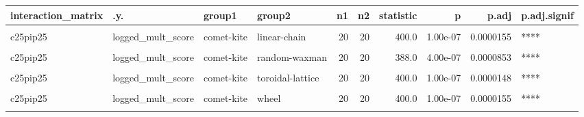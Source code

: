 \documentclass[
]{book}
\begin{document}
\begin{table}
\centering
\begin{tabular}{l|l|l|l|r|r|r|r|r|l}
\hline
interaction\_matrix & .y. & group1 & group2 & n1 & n2 & statistic & p & p.adj & p.adj.signif\\
\hline
\cellcolor{gray!6}{c25pip25} & \cellcolor{gray!6}{logged\_mult\_score} & \cellcolor{gray!6}{comet-kite} & \cellcolor{gray!6}{cycle} & \cellcolor{gray!6}{20} & \cellcolor{gray!6}{20} & \cellcolor{gray!6}{400.0} & \cellcolor{gray!6}{1.00e-07} & \cellcolor{gray!6}{0.0000155} & \cellcolor{gray!6}{****}\\
\hline
c25pip25 & logged\_mult\_score & comet-kite & linear-chain & 20 & 20 & 400.0 & 1.00e-07 & 0.0000155 & ****\\
\hline
\cellcolor{gray!6}{c25pip25} & \cellcolor{gray!6}{logged\_mult\_score} & \cellcolor{gray!6}{comet-kite} & \cellcolor{gray!6}{random-barabasi-albert} & \cellcolor{gray!6}{20} & \cellcolor{gray!6}{20} & \cellcolor{gray!6}{399.0} & \cellcolor{gray!6}{1.00e-07} & \cellcolor{gray!6}{0.0000177} & \cellcolor{gray!6}{****}\\
\hline
c25pip25 & logged\_mult\_score & comet-kite & random-waxman & 20 & 20 & 388.0 & 4.00e-07 & 0.0000853 & ****\\
\hline
\cellcolor{gray!6}{c25pip25} & \cellcolor{gray!6}{logged\_mult\_score} & \cellcolor{gray!6}{comet-kite} & \cellcolor{gray!6}{star} & \cellcolor{gray!6}{20} & \cellcolor{gray!6}{20} & \cellcolor{gray!6}{0.0} & \cellcolor{gray!6}{0.00e+00} & \cellcolor{gray!6}{0.0000000} & \cellcolor{gray!6}{****}\\
\hline
c25pip25 & logged\_mult\_score & comet-kite & toroidal-lattice & 20 & 20 & 400.0 & 1.00e-07 & 0.0000148 & ****\\
\hline
\cellcolor{gray!6}{c25pip25} & \cellcolor{gray!6}{logged\_mult\_score} & \cellcolor{gray!6}{comet-kite} & \cellcolor{gray!6}{well-mixed} & \cellcolor{gray!6}{20} & \cellcolor{gray!6}{20} & \cellcolor{gray!6}{400.0} & \cellcolor{gray!6}{1.00e-07} & \cellcolor{gray!6}{0.0000151} & \cellcolor{gray!6}{****}\\
\hline
c25pip25 & logged\_mult\_score & comet-kite & wheel & 20 & 20 & 400.0 & 1.00e-07 & 0.0000155 & ****\\
\hline
\cellcolor{gray!6}{c25pip25} & \cellcolor{gray!6}{logged\_mult\_score} & \cellcolor{gray!6}{comet-kite} & \cellcolor{gray!6}{windmill} & \cellcolor{gray!6}{20} & \cellcolor{gray!6}{20} & \cellcolor{gray!6}{400.0} & \cellcolor{gray!6}{1.00e-07} & \cellcolor{gray!6}{0.0000148} & \cellcolor{gray!6}{****}\\

\end{tabular}
\end{table}
\end{document}
